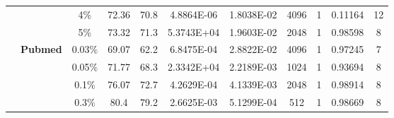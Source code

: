 \begin{table}[htbp]
\begin{tabular}{ccccc|cccccc}
          &       & 4\%   & \cellcolor[rgb]{ .388,  .745,  .482}72.36 & \cellcolor[rgb]{ .973,  .412,  .42}70.8 & 4.8864E-06 & 1.8038E-02 & 4096  & 1     & 0.11164 & 12 \\
          &       & 5\%   & \cellcolor[rgb]{ .388,  .745,  .482}73.32 & \cellcolor[rgb]{ .973,  .412,  .42}71.3 & 5.3743E+04 & 1.9603E-02 & 2048  & 1     & 0.98598 & 8 \\
          & \multirow{4}[1]{*}{\textbf{Pubmed}} & 0.03\% & \cellcolor[rgb]{ .388,  .745,  .482}69.07 & \cellcolor[rgb]{ .973,  .412,  .42}62.2 & 6.8475E-04 & 2.8822E-02 & 4096  & 1     & 0.97245 & 7 \\
          &       & 0.05\% & \cellcolor[rgb]{ .388,  .745,  .482}71.77 & \cellcolor[rgb]{ .973,  .412,  .42}68.3 & 2.3342E+04 & 2.2189E-03 & 1024  & 1     & 0.93694 & 8 \\
          &       & 0.1\% & \cellcolor[rgb]{ .388,  .745,  .482}76.07 & \cellcolor[rgb]{ .973,  .412,  .42}72.7 & 4.2629E-04 & 4.1339E-03 & 2048  & 1     & 0.98914 & 8 \\
          &       & 0.3\% & \cellcolor[rgb]{ .388,  .745,  .482}80.4 & \cellcolor[rgb]{ .973,  .412,  .42}79.2 & 2.6625E-03 & 5.1299E-04 & 512   & 1     & 0.98669 & 8 \\
    \bottomrule
    \bottomrule
    \end{tabular}%
  \label{tab:hyperparameters_without_validation}%
\end{table}%
